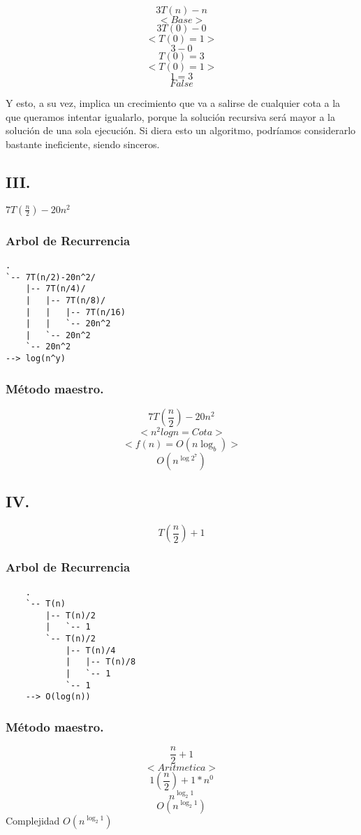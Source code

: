 \documentclass[12pt]{exam}
\begin{document}
$$ 3T(n) - n$$
$$ <Base> $$
$$ 3T(0) - 0 $$
$$ <T(0) = 1>  $$
$$ 3 - 0 $$
$$ T(0) = 3 $$
$$ <T(0) = 1>  $$
$$ 1 = 3 $$
$$ False $$

Y esto, a su vez, implica un crecimiento que va a salirse de cualquier
cota a la que queramos intentar igualarlo, porque la solución recursiva será
mayor a la solución de una sola ejecución. Si diera esto un algoritmo, podríamos
considerarlo bastante ineficiente, siendo sinceros.

\subsection*{III.}
$ 7T(\frac{n}{2}) -20n^2$

\subsubsection*{Arbol de Recurrencia}
\begin{verbatim}
.
`-- 7T(n/2)-20n^2/
    |-- 7T(n/4)/
    |   |-- 7T(n/8)/
    |   |   |-- 7T(n/16)
    |   |   `-- 20n^2  
    |   `-- 20n^2
    `-- 20n^2
--> log(n^y)
\end{verbatim}

\subsubsection*{Método maestro.}
$$ 7T(\frac{n}{2}) -20n^2$$
$$ <n^2 log n=Cota> $$
$$ <f(n) = O(n \log_{b})> $$
$$ O(n^{\log{2}^7}) $$

\subsection*{IV.}
$$ T(\frac{n}{2}) + 1 $$
\subsubsection*{Arbol de Recurrencia}
\begin{verbatim}
    .
    `-- T(n)
        |-- T(n)/2
        |   `-- 1
        `-- T(n)/2
            |-- T(n)/4
            |   |-- T(n)/8
            |   `-- 1
            `-- 1
    --> O(log(n))
\end{verbatim}
\subsubsection*{Método maestro.}
$$ \frac{n}{2} + 1 $$
$$ <Aritmetica> $$
$$ 1(\frac{n}{2}) + 1*n^0 $$
$$ n^{\log_{2}1} $$
$$ O(n^{\log_{2}1})$$
Complejidad $ O(n^{\log_{2}1})$
\end{document}
